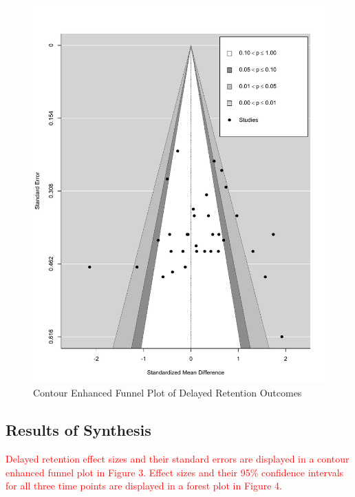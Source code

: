 \documentclass[
  english,
  man, donotrepeattitle,mask,floatsintext]{apa7}
\begin{document}
\begin{figure}

{\centering \includegraphics[height=1\textheight]{../../figures/figure3} 

}

\caption{Contour Enhanced Funnel Plot of Delayed Retention Outcomes}\label{fig:fig3}
\end{figure}

\hypertarget{results-of-synthesis}{%
\subsection{Results of Synthesis}\label{results-of-synthesis}}

\textcolor{red}{Delayed retention effect sizes and their standard errors are displayed in a contour enhanced funnel plot in Figure 3. Effect sizes and their 95\% confidence intervals for all three time points are displayed in a forest plot in Figure 4.}
\end{document}
